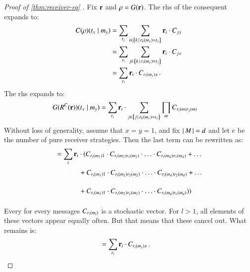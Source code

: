\begin{proof}[Proof of \ref{thm:receiver-eq} ]
  Fix $\mathrm{\mathbf{r}}$ and $\rho = G(\mathrm{\mathbf{r}})$. The rhs of the consequent
  expands to:
  \begin{align*}
    C(\rho)(t_x \mid m_y) & = \sum_{t_j}
    \sum_{i \in \left\{k \thinspace \mid \thinspace r_k(m_y) = t_x\right\}}
    \mathrm{\mathbf{r}}_i \cdot C_{jx} \\
    & = \sum_{r_i} \sum_{j \in \left\{k \thinspace \mid \thinspace r_i(m_y) = t_j\right\}}
    \mathrm{\mathbf{r}}_i \cdot C_{jx} \\
    & = \sum_{r_i} \mathrm{\mathbf{r}}_i \cdot C_{r_i(m_y)x} \,.
  \end{align*}
  The rhs expands to:
  \begin{align*}
    G(R^C(\mathrm{\mathbf{r}}))(t_x \mid m_y) & = \sum_{r_i}
    \mathrm{\mathbf{r}}_i \cdot \sum_{j \in \left\{j \thinspace \mid \thinspace r_k(m_y) =
        t_x\right\}} 
    \prod_{m} C_{r_i(m)r_j(m)}
  \end{align*}
  Without loss of generality, assume that $x=y=1$, and fix
  $\left \lvert \, M \, \right\rvert=d$ and let $e$ be the number of pure receiver
  strategies. Then the last term can be rewritten as:
  \begin{align*}
    & = \sum_{i}
    \Rmixed_i \cdot ( C_{\Rpure_i(\messg_1)1} \cdot
      C_{\Rpure_i(\messg_2)\Rpure_1(\messg_2)} \cdot \ldots \cdot
      C_{\Rpure_i(\messg_d)\Rpure_1(\messg_d)} + \ldots  \\
      & \textcolor{white}{ = \sum_{i}
    \Rmixed_i  (}  +  C_{\Rpure_i(\messg_1)1} \cdot
      C_{\Rpure_i(\messg_2)\Rpure_2(\messg_2)} \cdot \ldots \cdot
      C_{\Rpure_i(\messg_d)\Rpure_2(\messg_d)} + \ldots  \\
      & \textcolor{white}{ = \sum_{i}
    \Rmixed_i  (}  + C_{\Rpure_i(\messg_1)1} \cdot
      C_{\Rpure_i(\messg_2)\Rpure_e(\messg_2)} \cdot \ldots \cdot
      C_{\Rpure_i(\messg_d)\Rpure_e(\messg_d)}) )
  \end{align*}
  Every for every messages $C_{r_i(m_l)}$ is a stochastic
  vector. For $l>1$, all elements of these vectors appear equally
  often. But that means that these cancel out. What remains is:
  \begin{align*}
    & = \sum_{r_i} \mathrm{\mathbf{r}}_i \cdot C_{r_i(m_y)x} \,.
  \end{align*}
\end{proof}





